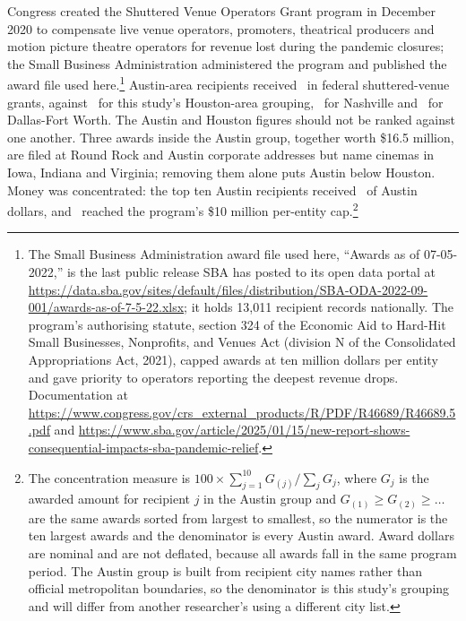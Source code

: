 Congress created the Shuttered Venue Operators Grant program in December 2020
to compensate live venue operators, promoters, theatrical producers and
motion picture theatre operators for revenue lost during the pandemic
closures; the Small Business Administration administered the program and
published the award file used here.\footnote{The Small Business
Administration award file used here, ``Awards as of 07-05-2022,'' is the
last public release SBA has posted to its open data portal at
\url{https://data.sba.gov/sites/default/files/distribution/SBA-ODA-2022-09-001/awards-as-of-7-5-22.xlsx};
it holds 13{,}011 recipient records nationally. The program's authorising
statute, section 324 of the Economic Aid to Hard-Hit Small Businesses,
Nonprofits, and Venues Act (division N of the Consolidated Appropriations
Act, 2021), capped awards at ten million dollars per entity and gave
priority to operators reporting the deepest revenue drops. Documentation at
\url{https://www.congress.gov/crs_external_products/R/PDF/R46689/R46689.5.pdf}
and \url{https://www.sba.gov/article/2025/01/15/new-report-shows-consequential-impacts-sba-pandemic-relief}.}
Austin-area recipients received \NSvogAustinTotal\ in federal shuttered-venue
grants, against \NSvogHoustonAreaTotal\ for this study's Houston-area
grouping, \NSvogNashvilleTotal\ for Nashville and \NSvogDfwAreaTotal\ for
Dallas-Fort Worth. The Austin and Houston figures should not be ranked
against one another. Three awards inside the Austin group, together worth
\$16.5 million, are filed at Round Rock and Austin corporate addresses but
name cinemas in Iowa, Indiana and Virginia; removing them alone puts Austin
below Houston. Money was concentrated: the top ten Austin recipients
received \NSvogAustinTopOneZeroShare\ of Austin dollars, and
\NSvogAustinCapHits\ reached the program's \$10 million per-entity
cap.\footnote{The concentration measure is
\(100 \times \sum_{j=1}^{10} G_{(j)} \big/ \sum_{j} G_j\), where \(G_j\) is the
awarded amount for recipient \(j\) in the Austin group and \(G_{(1)} \ge
G_{(2)} \ge \dots\) are the same awards sorted from largest to smallest, so
the numerator is the ten largest awards and the denominator is every Austin
award. Award dollars are nominal and are not deflated, because all awards
fall in the same program period. The Austin group is built from recipient
city names rather than official metropolitan boundaries, so the denominator
is this study's grouping and will differ from another researcher's using a
different city list.}

